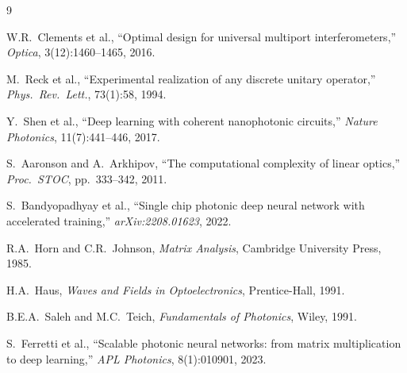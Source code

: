\documentclass[12pt, a4paper]{article}
\begin{document}

\begin{thebibliography}{9}

W.R.\ Clements et al.,
``Optimal design for universal multiport interferometers,''
\textit{Optica}, 3(12):1460--1465, 2016.

M.\ Reck et al.,
``Experimental realization of any discrete unitary operator,''
\textit{Phys.\ Rev.\ Lett.}, 73(1):58, 1994.

Y.\ Shen et al.,
``Deep learning with coherent nanophotonic circuits,''
\textit{Nature Photonics}, 11(7):441--446, 2017.

S.\ Aaronson and A.\ Arkhipov,
``The computational complexity of linear optics,''
\textit{Proc.\ STOC}, pp.\ 333--342, 2011.

S.\ Bandyopadhyay et al.,
``Single chip photonic deep neural network with accelerated training,''
\textit{arXiv:2208.01623}, 2022.

R.A.\ Horn and C.R.\ Johnson,
\textit{Matrix Analysis}, Cambridge University Press, 1985.

H.A.\ Haus,
\textit{Waves and Fields in Optoelectronics}, Prentice-Hall, 1991.

B.E.A.\ Saleh and M.C.\ Teich,
\textit{Fundamentals of Photonics}, Wiley, 1991.

S.\ Ferretti et al.,
``Scalable photonic neural networks: from matrix multiplication to deep learning,''
\textit{APL Photonics}, 8(1):010901, 2023.

\end{thebibliography}
\end{document}
